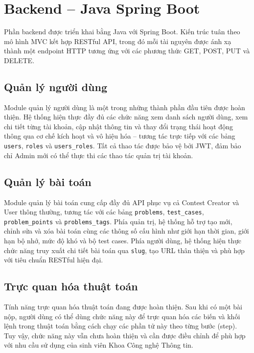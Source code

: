 \documentclass[12pt, a4paper]{report}
\begin{document}
\section{Backend -- Java Spring Boot}

Phần backend được triển khai bằng Java với Spring Boot. Kiến trúc tuân theo mô hình \ac{MVC} kết hợp \ac{REST}ful \ac{API}, trong đó mỗi tài nguyên được ánh xạ thành một endpoint \ac{HTTP} tương ứng với các phương thức GET, POST, PUT và DELETE.

\subsection{Quản lý người dùng}

Module quản lý người dùng là một trong những thành phần đầu tiên được hoàn thiện. Hệ thống hiện thực đầy đủ các chức năng xem danh sách người dùng, xem chi tiết từng tài khoản, cập nhật thông tin và thay đổi trạng thái hoạt động thông qua cơ chế kích hoạt và vô hiệu hóa -- tương tác trực tiếp với các bảng \texttt{users}, \texttt{roles} và \texttt{users\_roles}. Tất cả thao tác được bảo vệ bởi \ac{JWT}, đảm bảo chỉ Admin mới có thể thực thi các thao tác quản trị tài khoản.

\subsection{Quản lý bài toán}

Module quản lý bài toán cung cấp đầy đủ \ac{API} phục vụ cả Contest Creator và User thông thường, tương tác với các bảng \texttt{problems}, \texttt{test\_cases}, \texttt{problem\_points} và \texttt{problems\_tags}. Phía quản trị, hệ thống hỗ trợ tạo mới, chỉnh sửa và xóa bài toán cùng các thông số cấu hình như giới hạn thời gian, giới hạn bộ nhớ, mức độ khó và bộ test cases. Phía người dùng, hệ thống hiện thực chức năng truy xuất chi tiết bài toán qua \texttt{slug}, tạo URL thân thiện và phù hợp với tiêu chuẩn \ac{REST}ful hiện đại.

\subsection{Trực quan hóa thuật toán}

Tính năng trực quan hóa thuật toán đang được hoàn thiện. Sau khi có một bài nộp, người dùng có thể dùng chức năng này để trực quan hóa các biến và khối lệnh trong thuật toán bằng cách chạy các phần tử này theo từng bước (step). Tuy vậy, chức năng này vẫn chưa hoàn thiện và cần được điều chỉnh để phù hợp với nhu cầu sử dụng của sinh viên Khoa Công nghệ Thông tin.
\end{document}
